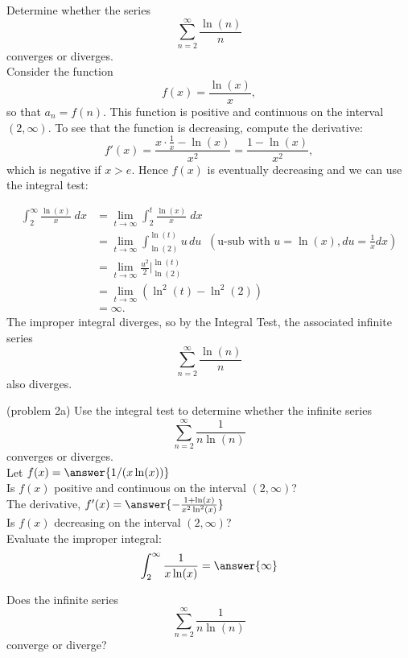 \documentclass[handout]{ximera}
\begin{document}
\begin{example}[example 2]
Determine whether the series
\[
\sum_{n=2}^\infty \frac{\ln(n)}{n}
\]
converges or diverges.\\
Consider the function
\[
f(x) = \frac{\ln(x)}{x},
\]
so that $a_n = f(n)$.
This function is positive and continuous on the interval $(2, \infty)$.
To see that the function is decreasing, compute the derivative:
\[
f'(x) = \frac{x\cdot\frac{1}{x}- \ln(x)}{x^2} = \frac{1-\ln(x)}{x^2},
\]
which is negative if $x > e$. Hence $f(x)$ is eventually decreasing and we can use the integral test:

\begin{align*}
\int_2^\infty \frac{\ln(x)}{x} \; dx &= \lim_{t \to \infty} \int_2^t \frac{\ln(x)}{x} \; dx\\
&= \lim_{t \to \infty} \int_{\ln(2)}^{\ln(t)} u \, du \;\; \left(\text{u-sub with $u = \ln(x), du = \frac{1}{x} dx$}\right)\\
&= \lim_{t \to \infty} \frac{u^2}{2} \bigg|_{\ln(2)}^{\ln(t)}\\
&= \lim_{t \to \infty} \left(\ln^2(t) - \ln^2(2) \right)\\
&= \infty.
\end{align*}
The improper integral diverges, so by the Integral Test, the associated infinite series
\[
\sum_{n=2}^\infty \frac{\ln(n)}{n}
\]
also diverges.
\end{example}



\begin{problem}(problem 2a)
Use the integral test to determine whether the infinite series
\[
\sum_{n=2}^\infty \frac{1}{n\ln(n)}
\]
converges or diverges.\\

Let $f(x) = \answer{1/(x\ln(x))}$\\

Is $f(x)$ positive and continuous on the interval $(2, \infty)$?
\\ %

The derivative, $f'(x) = \answer{-\frac{1+\ln(x)}{x^2 \ln^2(x)}}$\\

Is $f(x)$ decreasing on the interval $(2, \infty)$? \\

Evaluate the improper integral: 
\[
 \int_2^\infty \frac{1}{x\ln(x)} = \answer{\infty}
\]

Does the infinite series
\[
\sum_{n=2}^\infty \frac{1}{n\ln(n)}
\]
converge or diverge? 


\end{problem}
\end{document}
